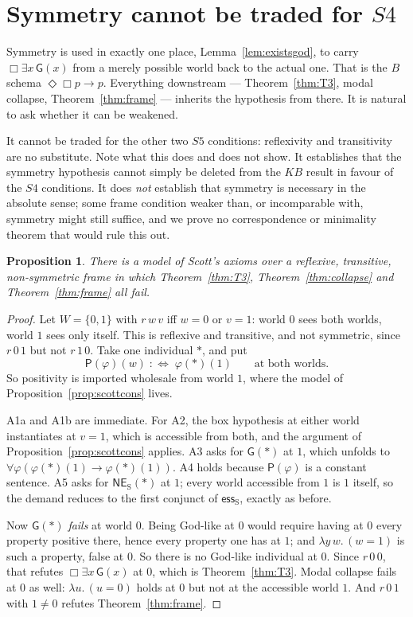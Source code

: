 \documentclass[11pt]{article}
\theoremstyle{plain}
\newtheorem{proposition}[theorem]{Proposition}
\theoremstyle{definition}
\newcommand{\esss}{\mathrel{\mathsf{ess}_{\mathrm{S}}}}
\newcommand{\NES}{\mathsf{NE}_{\mathrm{S}}}
\newcommand{\Gd}{\mathsf{G}}
\newcommand{\Pos}{\mathsf{P}}
\begin{document}
\section{Symmetry cannot be traded for $S4$}\label{sec:symm}

Symmetry is used in exactly one place, Lemma~\ref{lem:existsgod}, to carry
$\Box\exists x\,\Gd(x)$ from a merely possible world back to the actual one.
That is the $B$ schema $\Diamond\Box p \to p$. Everything downstream ---
Theorem~\ref{thm:T3}, modal collapse, Theorem~\ref{thm:frame} --- inherits the
hypothesis from there. It is natural to ask whether it can be weakened.

It cannot be traded for the other two $S5$ conditions: reflexivity and
transitivity are no substitute. Note what this does and does not show. It
establishes that the symmetry hypothesis cannot simply be deleted from the
$KB$ result in favour of the $S4$ conditions. It does \emph{not} establish
that symmetry is necessary in the absolute sense; some frame condition weaker
than, or incomparable with, symmetry might still suffice, and we prove no
correspondence or minimality theorem that would rule this out.

\begin{proposition}\label{prop:nosymm}
There is a model of Scott's axioms over a reflexive, transitive, non-symmetric
frame in which Theorem~\ref{thm:T3}, Theorem~\ref{thm:collapse} and
Theorem~\ref{thm:frame} all fail.
\end{proposition}

\begin{proof}
Let $W = \{0,1\}$ with $r\,w\,v$ iff $w = 0$ or $v = 1$: world $0$ sees both
worlds, world $1$ sees only itself. This is reflexive and transitive, and not
symmetric, since $r\,0\,1$ but not $r\,1\,0$. Take one individual $*$, and put
\[
  \Pos(\varphi)(w) \;:\Leftrightarrow\; \varphi(*)(1)
  \qquad\text{at both worlds}.
\]
So positivity is imported wholesale from world $1$, where the model of
Proposition~\ref{prop:scottcons} lives.

A1a and A1b are immediate. For A2, the box hypothesis at either world
instantiates at $v = 1$, which is accessible from both, and the argument of
Proposition~\ref{prop:scottcons} applies. A3 asks for $\Gd(*)$ at $1$, which
unfolds to $\forall\varphi(\varphi(*)(1) \to \varphi(*)(1))$. A4 holds because
$\Pos(\varphi)$ is a constant sentence. A5 asks for $\NES(*)$ at $1$; every
world accessible from $1$ is $1$ itself, so the demand reduces to the first
conjunct of $\esss$, exactly as before.

Now $\Gd(*)$ \emph{fails} at world $0$. Being God-like at $0$ would require
having at $0$ every property positive there, hence every property one has at
$1$; and $\lambda y\,w.\,(w = 1)$ is such a property, false at $0$. So there is
no God-like individual at $0$. Since $r\,0\,0$, that refutes
$\Box\exists x\,\Gd(x)$ at $0$, which is Theorem~\ref{thm:T3}. Modal collapse
fails at $0$ as well: $\lambda u.\,(u=0)$ holds at $0$ but not at the
accessible world $1$. And $r\,0\,1$ with $1 \neq 0$ refutes
Theorem~\ref{thm:frame}.
\end{proof}
\end{document}
